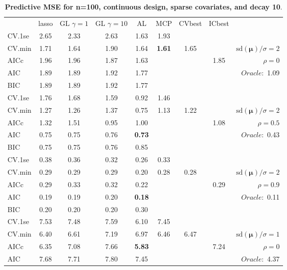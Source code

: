 \clearpage
\begin{table}\vspace{-.5cm}
\caption[l]{ { \bf Predictive MSE for n=100, continuous design, 
sparse covariates, and  decay  10}.}
\vspace{-.5cm}
\footnotesize{}
\begin{center}
\begin{tabular}{l*{7}{c}|r}
 & lasso & GL $\gamma=1$ & GL $\gamma=10$ & AL & MCP  & CVbest & ICbest  \\
\cline{1-9}
CV.1se & 2.65 & 2.33 & 2.63 & 1.63 & 1.93 & & & \\
CV.min & 1.71 & 1.64 & 1.90 & 1.64 & {\bf 1.61} & 1.65 & & $\mathrm{sd}(\mathbf{\mu})/\sigma=2$ \\
AICc & 1.96 & 1.96 & 1.87 & 1.63 & & & 1.85 &  $\rho=0$ \\
AIC & 1.89 & 1.89 & 1.92 & 1.77 & & & &  \multirow{2}{*}{$Oracle: $ 1.09} \\
BIC & 1.89 & 1.89 & 1.92 & 1.77 & & & &  \\
 \hline 
CV.1se & 1.76 & 1.68 & 1.59 & 0.92 & 1.46 & & & \\
CV.min & 1.27 & 1.26 & 1.37 & 0.75 & 1.13 & 1.22 & & $\mathrm{sd}(\mathbf{\mu})/\sigma=2$ \\
AICc & 1.32 & 1.51 & 0.95 & 1.00 & & & 1.08 &  $\rho=0.5$ \\
AIC & 0.75 & 0.75 & 0.76 & {\bf 0.73} & & & &  \multirow{2}{*}{$Oracle: $ 0.43} \\
BIC & 0.75 & 0.75 & 0.76 & 0.85 & & & &  \\
 \hline 
CV.1se & 0.38 & 0.36 & 0.32 & 0.26 & 0.33 & & & \\
CV.min & 0.29 & 0.29 & 0.29 & 0.20 & 0.28 & 0.28 & & $\mathrm{sd}(\mathbf{\mu})/\sigma=2$ \\
AICc & 0.29 & 0.33 & 0.32 & 0.22 & & & 0.29 &  $\rho=0.9$ \\
AIC & 0.19 & 0.19 & 0.20 & {\bf 0.18} & & & &  \multirow{2}{*}{$Oracle: $ 0.11} \\
BIC & 0.20 & 0.20 & 0.20 & 0.30 & & & &  \\
 \hline 
CV.1se & 7.53 & 7.48 & 7.59 & 6.10 & 7.45 & & & \\
CV.min & 6.40 & 6.61 & 7.19 & 6.97 & 6.46 & 6.47 & & $\mathrm{sd}(\mathbf{\mu})/\sigma=1$ \\
AICc & 6.35 & 7.08 & 7.66 & {\bf 5.83} & & & 7.24 &  $\rho=0$ \\
AIC & 7.68 & 7.71 & 7.80 & 7.45 & & & &  \multirow{2}{*}{$Oracle: $ 4.37} \\

\end{tabular}
\end{center}
\end{table}
